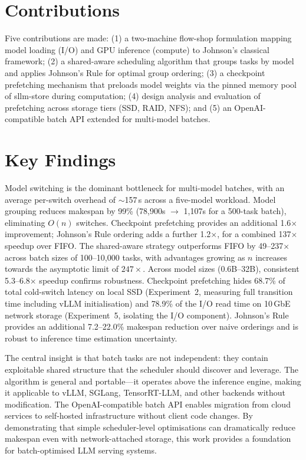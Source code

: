 \documentclass[logo,bsc,singlespacing,parskip,online]{infthesis}
\begin{document}
\section{Contributions}

Five contributions are made: (1) a two-machine flow-shop formulation mapping model loading (I/O) and GPU inference (compute) to Johnson's classical framework; (2) a shared-aware scheduling algorithm that groups tasks by model and applies Johnson's Rule for optimal group ordering; (3) a checkpoint prefetching mechanism that preloads model weights via the pinned memory pool of sllm-store during computation; (4) design analysis and evaluation of prefetching across storage tiers (SSD, RAID, NFS); and (5) an OpenAI-compatible batch API extended for multi-model batches.

\section{Key Findings}

Model switching is the dominant bottleneck for multi-model batches, with an average per-switch overhead of $\sim$157\,s across a five-model workload. Model grouping reduces makespan by 99\% (78,900s $\to$ 1,107s for a 500-task batch), eliminating $O(n)$ switches. Checkpoint prefetching provides an additional 1.6$\times$ improvement; Johnson's Rule ordering adds a further 1.2$\times$, for a combined 137$\times$ speedup over FIFO. The shared-aware strategy outperforms FIFO by 49--237$\times$ across batch sizes of 100--10,000 tasks, with advantages growing as $n$ increases towards the asymptotic limit of $247\times$. Across model sizes (0.6B--32B), consistent 5.3--6.8$\times$ speedup confirms robustness. Checkpoint prefetching hides 68.7\% of total cold-switch latency on local SSD (Experiment~2, measuring full transition time including vLLM initialisation) and 78.9\% of the I/O read time on 10\,GbE network storage (Experiment~5, isolating the I/O component). Johnson's Rule provides an additional 7.2--22.0\% makespan reduction over naive orderings and is robust to inference time estimation uncertainty.

The central insight is that batch tasks are not independent: they contain exploitable shared structure that the scheduler should discover and leverage. The algorithm is general and portable---it operates above the inference engine, making it applicable to vLLM, SGLang, TensorRT-LLM, and other backends without modification. The OpenAI-compatible batch API enables migration from cloud services to self-hosted infrastructure without client code changes. By demonstrating that simple scheduler-level optimisations can dramatically reduce makespan even with network-attached storage, this work provides a foundation for batch-optimised LLM serving systems.





\end{document}
